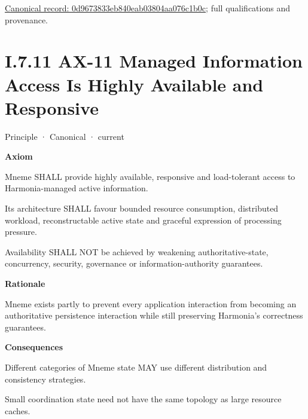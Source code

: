 {\footnotesize \href{../../../../continuum/motivation/principle/0d9673833eb840eab03804aa076c1b0c.md}{Canonical record: 0d9673833eb840eab03804aa076c1b0c}; full qualifications and provenance.}\par
\section*{I.7.11 AX-11 Managed Information Access Is Highly Available and Responsive}
\label{navigation:I.7.11}

\label{element:8a1e995f16954484a78ae1c5c114d546}
{\small Principle · Canonical · current}\par

\par\medskip\textbf{Axiom}\par


Mneme SHALL provide highly available, responsive and load-tolerant
access to Harmonia-managed active information.



Its architecture SHALL favour bounded resource consumption, distributed
workload, reconstructable active state and graceful expression of
processing pressure.



Availability SHALL NOT be achieved by weakening authoritative-state,
concurrency, security, governance or information-authority guarantees.



\par\medskip\textbf{Rationale}\par


Mneme exists partly to prevent every application interaction from
becoming an authoritative persistence interaction while still preserving
Harmonia's correctness guarantees.



\par\medskip\textbf{Consequences}\par


Different categories of Mneme state MAY use different distribution and
consistency strategies.



Small coordination state need not have the same topology as large
resource caches.



